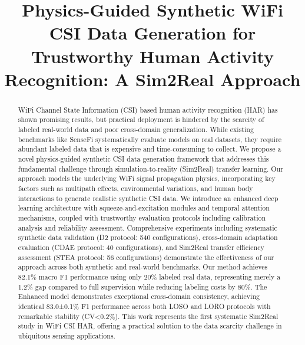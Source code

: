 \documentclass[journal]{IEEEtran}
\begin{document}
\title{Physics-Guided Synthetic WiFi CSI Data Generation for Trustworthy Human Activity Recognition: A Sim2Real Approach}

\author{
}

\maketitle

\begin{abstract}
WiFi Channel State Information (CSI) based human activity recognition (HAR) has shown promising results, but practical deployment is hindered by the scarcity of labeled real-world data and poor cross-domain generalization. While existing benchmarks like SenseFi systematically evaluate models on real datasets, they require abundant labeled data that is expensive and time-consuming to collect. We propose a novel physics-guided synthetic CSI data generation framework that addresses this fundamental challenge through simulation-to-reality (Sim2Real) transfer learning. Our approach models the underlying WiFi signal propagation physics, incorporating key factors such as multipath effects, environmental variations, and human body interactions to generate realistic synthetic CSI data. We introduce an enhanced deep learning architecture with squeeze-and-excitation modules and temporal attention mechanisms, coupled with trustworthy evaluation protocols including calibration analysis and reliability assessment. Comprehensive experiments including systematic synthetic data validation (D2 protocol: 540 configurations), cross-domain adaptation evaluation (CDAE protocol: 40 configurations), and Sim2Real transfer efficiency assessment (STEA protocol: 56 configurations) demonstrate the effectiveness of our approach across both synthetic and real-world benchmarks. Our method achieves 82.1\% macro F1 performance using only 20\% labeled real data, representing merely a 1.2\% gap compared to full supervision while reducing labeling costs by 80\%. The Enhanced model demonstrates exceptional cross-domain consistency, achieving identical 83.0±0.1\% F1 performance across both LOSO and LORO protocols with remarkable stability (CV<0.2\%). This work represents the first systematic Sim2Real study in WiFi CSI HAR, offering a practical solution to the data scarcity challenge in ubiquitous sensing applications.
\end{abstract}
\end{document}
